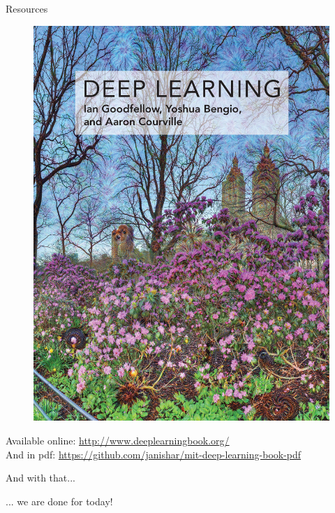 \documentclass[]{beamer}
\begin{document}
\begin{frame}
   {Resources}
   \scriptsize
   \vspace{-0.3cm}
   \begin{figure}
      \includegraphics[scale=0.36]{figures/deep_learning_book.jpg}
   \end{figure}
   Available online: \url{http://www.deeplearningbook.org/} \newline \\
   And in pdf: \url{https://github.com/janishar/mit-deep-learning-book-pdf}
\end{frame}

\begin{frame}
   {And with that...}
   \begin{center}
   ... we are done for today!
   \end{center}
\end{frame}
\end{document}
